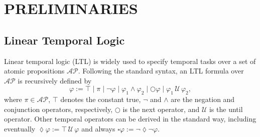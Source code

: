 \documentclass[lettersize,journal]{IEEEtran}
\theoremstyle{italiclemma}
\theoremstyle{italiclemma}
\theoremstyle{definition}
\begin{document}


\section{PRELIMINARIES}
\label{sec:preliminaries}
\subsection{Linear Temporal Logic}

Linear temporal logic (LTL) \cite{baier2008principles} is widely used to specify temporal tasks over a set of atomic propositions $\mathcal{AP}$. Following the standard syntax, an LTL formula over $\mathcal{AP}$ is recursively defined by
\[
\varphi := \top \mid \pi \mid \neg \varphi \mid \varphi_1 \wedge \varphi_2 \mid \bigcirc \varphi \mid \varphi_1 \,\mathcal{U}\, \varphi_2,
\]
where $\pi \in \mathcal{AP}$, $\top$ denotes the constant true, $\neg$ and $\wedge$ are the negation and conjunction operators, respectively, $\bigcirc$ is the next operator, and $\mathcal{U}$ is the until operator. Other temporal operators can be derived in the standard way, including eventually $\lozenge \varphi := \top \,\mathcal{U}\, \varphi$ and always $\square \varphi := \neg \lozenge \neg \varphi$.
\end{document}
